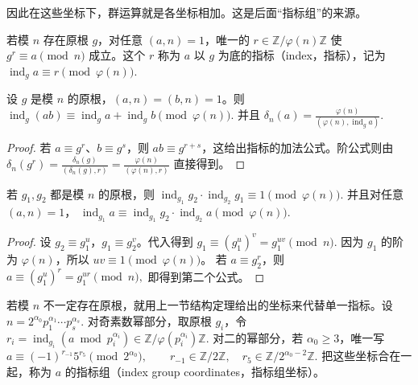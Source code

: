 \documentclass[oneside]{AJbook}
\newcommand{\Z}{\mathbb Z}
\newcommand{\Cyc}[1]{\Z/#1\Z}
\begin{document}
因此在这些坐标下，群运算就是各坐标相加。这是后面“指标组”的来源。

\begin{definition}[指标]
若模 $n$ 存在原根 $g$，对任意 $(a,n)=1$，唯一的
\(
  r\in \Z/\varphi(n)\Z
\)
使
\(
  g^r\equiv a\pmod n
\)
成立。这个 $r$ 称为 $a$ 以 $g$ 为底的指标（index，指标），记为
\(
  \operatorname{ind}_g a\equiv r\pmod{\varphi(n)}.
\)
\end{definition}

\begin{proposition}[指标的基本性质]
设 $g$ 是模 $n$ 的原根，$(a,n)=(b,n)=1$。则
\(
  \operatorname{ind}_g(ab)
  \equiv
  \operatorname{ind}_g a+\operatorname{ind}_g b
  \pmod{\varphi(n)}.
\)
并且
\(
  \delta_n(a)
  =
  \frac{\varphi(n)}
  {(\varphi(n),\operatorname{ind}_g a)}.
\)
\end{proposition}

\begin{proof}
若 $a\equiv g^r$、$b\equiv g^s$，则 $ab\equiv g^{r+s}$，这给出指标的加法公式。阶公式则由
\(
  \delta_n(g^r)=\frac{\delta_n(g)}{(\delta_n(g),r)}
  =
  \frac{\varphi(n)}{(\varphi(n),r)}
\)
直接得到。
\end{proof}

\begin{proposition}[换底公式]
若 $g_1,g_2$ 都是模 $n$ 的原根，则
\(
  \operatorname{ind}_{g_1}g_2\cdot \operatorname{ind}_{g_2}g_1
  \equiv 1\pmod{\varphi(n)}.
\)
并且对任意 $(a,n)=1$，
\(
  \operatorname{ind}_{g_1}a
  \equiv
  \operatorname{ind}_{g_1}g_2\cdot \operatorname{ind}_{g_2}a
  \pmod{\varphi(n)}.
\)
\end{proposition}

\begin{proof}
设 $g_2\equiv g_1^u$，$g_1\equiv g_2^v$。代入得到
\(
  g_1\equiv (g_1^u)^v=g_1^{uv}\pmod n.
\)
因为 $g_1$ 的阶为 $\varphi(n)$，所以 $uv\equiv1\pmod{\varphi(n)}$。
若 $a\equiv g_2^r$，则
\(
  a\equiv (g_1^u)^r=g_1^{ur}\pmod n,
\)
即得到第二个公式。
\end{proof}

\begin{definition}[指标组]
若模 $n$ 不一定存在原根，就用上一节结构定理给出的坐标来代替单一指标。设
\(
  n=2^{\alpha_0}p_1^{\alpha_1}\cdots p_s^{\alpha_s}.
\)
对奇素数幂部分，取原根 $g_i$，令
\(
  r_i=\operatorname{ind}_{g_i}(a\bmod p_i^{\alpha_i})
  \in \Cyc{\varphi(p_i^{\alpha_i})}.
\)
对二的幂部分，若 $\alpha_0\ge3$，唯一写
\(
  a\equiv (-1)^{r_{-1}}5^{r_5}\pmod {2^{\alpha_0}},
  \qquad
  r_{-1}\in\Cyc2,\quad r_5\in \Cyc{2^{\alpha_0-2}}.
\)
把这些坐标合在一起，称为 $a$ 的指标组（index group coordinates，指标组坐标）。
\end{definition}
\end{document}

